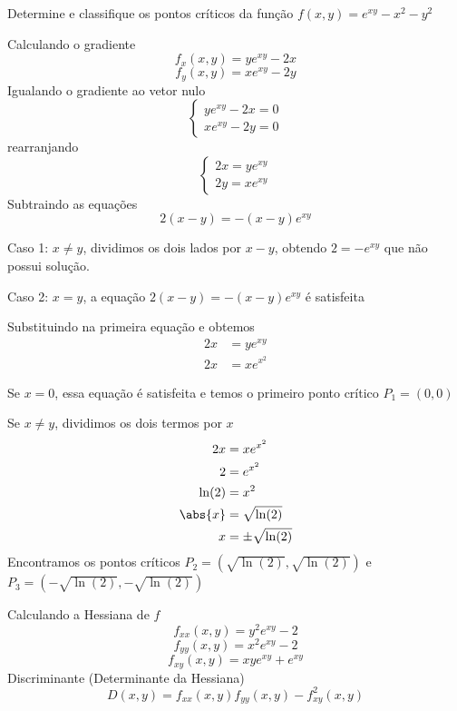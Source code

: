 \documentclass[a4paper,12pt,fleqn]{article}
\begin{document}

Determine e classifique os pontos críticos da função
\(
  f(x,y) = e^{xy} - x^2 - y^2
\)

\clearpagequestiononly

\begin{answer}
  Calculando o gradiente
  \[
    f_x(x, y)
    = y e^{xy} - 2x
  \]
  \[
    f_y(x, y)
    = x e^{xy} - 2y
  \]
  Igualando o gradiente ao vetor nulo
  \[
    \begin{cases}
      y e^{xy} - 2x = 0\\
      x e^{xy} - 2y = 0
    \end{cases}
  \]
  rearranjando
  \[
    \begin{cases}
      2x = y e^{xy} \\
      2y = x e^{xy}
    \end{cases}
  \]
  Subtraindo as equações
  \[
    2(x-y) = -(x-y)e^{xy}
  \]

  Caso 1: $x\neq y$, dividimos os dois lados por $x-y$, obtendo
  \(
    2 = -e^{xy}
  \)
  que não possui solução.

  Caso 2: $x=y$, a equação \(2(x-y) = -(x-y)e^{xy}\) é satisfeita

  Substituindo na primeira equação e obtemos
  \begin{align*}
    2x & = y e^{xy} \\
    2x & = x e^{x^2}
  \end{align*}

  Se $x=0$, essa equação é satisfeita e temos o primeiro ponto crítico \(P_1=(0, 0)\)

  Se $x\neq y$, dividimos os dois termos por $x$
  \begin{align*}
    2x      & = x e^{x^2}        \\
    2       & = e^{x^2}          \\
    \ln(2)  & = x^2              \\
    \abs{x} & = \sqrt{\ln(2)}    \\
    x       & = \pm\sqrt{\ln(2)}
  \end{align*}
  Encontramos os pontos críticos
  \(P_2 = \left( \sqrt{\ln(2)},  \sqrt{\ln(2)}\right)\) e
  \(P_3 = \left(-\sqrt{\ln(2)}, -\sqrt{\ln(2)}\right)\)

  \bigskip
  Calculando a Hessiana de $f$
  \[
    f_{xx}(x, y)
    = y^2 e^{xy}-2
  \]
  \[
    f_{yy}(x, y)
    = x^2 e^{xy}-2
  \]
  \[
    f_{xy}(x, y)
    = xy e^{xy}+e^{xy}
  \]
  Discriminante (Determinante da Hessiana)
  \[
    D(x, y) = f_{xx}(x, y)f_{yy}(x, y) - f^2_{xy}(x, y)
  \]


\end{answer}
\end{document}
